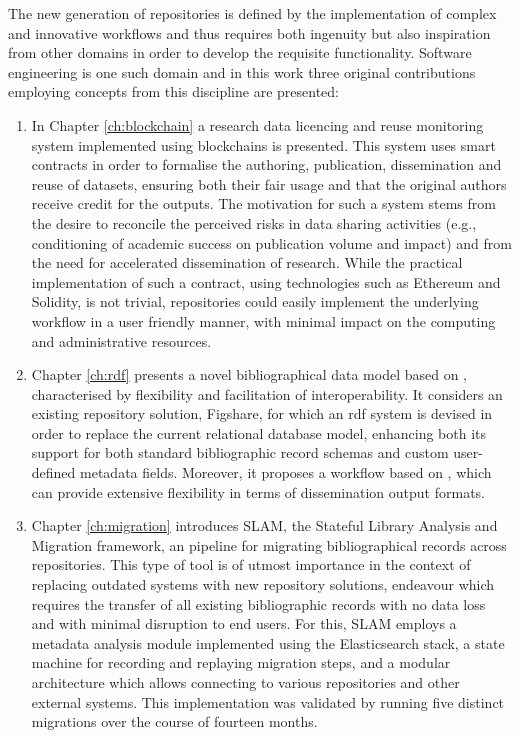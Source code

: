 The new generation of repositories is defined by the implementation of complex and innovative workflows and thus requires both ingenuity but also inspiration from other domains in order to develop the requisite functionality. Software engineering is one such domain and in this work three original contributions employing concepts from this discipline are presented:
\begin{enumerate}
    \item In Chapter \ref{ch:blockchain} a research data licencing and reuse monitoring system implemented using blockchains is presented. This system uses smart contracts in order to formalise the authoring, publication, dissemination and reuse of datasets, ensuring both their fair usage and that the original authors receive credit for the outputs. The motivation for such a system stems from the desire to reconcile the perceived risks in data sharing activities (e.g., conditioning of academic success on publication volume and impact) and from the need for accelerated dissemination of research. While the practical implementation of such a contract, using technologies such as Ethereum and Solidity, is not trivial, repositories could easily implement the underlying workflow in a user friendly manner, with minimal impact on the computing and administrative resources.
    
    \item Chapter \ref{ch:rdf} presents a novel bibliographical data model based on , characterised by flexibility and facilitation of interoperability. It considers an existing repository solution, Figshare, for which an \gls{rdf} system is devised in order to replace the current relational database model, enhancing both its support for both standard bibliographic record schemas and custom user-defined metadata fields. Moreover, it proposes a workflow based on , which can provide extensive flexibility in terms of dissemination output formats.
    
    \item Chapter \ref{ch:migration} introduces SLAM, the Stateful Library Analysis and Migration framework, an  pipeline for migrating bibliographical records across repositories. This type of tool is of utmost importance in the context of replacing outdated systems with new repository solutions, endeavour which requires the transfer of all existing bibliographic records with no data loss and with minimal disruption to end users. For this, SLAM employs a metadata analysis module implemented using the Elasticsearch stack, a state machine for recording and replaying migration steps, and a modular architecture which allows connecting to various repositories and other external systems. This implementation was validated by running five distinct migrations over the course of fourteen months.
\end{enumerate}

